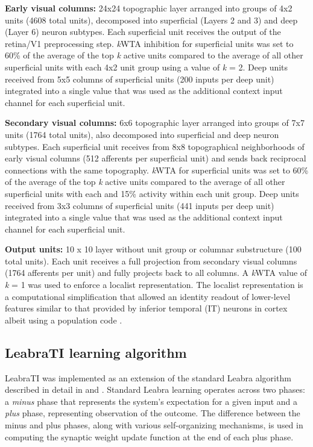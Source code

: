 \documentclass[dwyatte_dissertation.tex]{subfiles}
\begin{document}
\textbf{Early visual columns:} 24x24 topographic layer arranged into groups of 4x2 units (4608 total units), decomposed into superficial (Layers 2 and 3) and deep (Layer 6) neuron subtypes. Each superficial unit receives the output of the retina/V1 preprocessing step. \textit{k}WTA inhibition for superficial units was set to 60\% of the average of the top \textit{k} active units compared to the average of all other superficial units with each 4x2 unit group using a value of \textit{k} = 2. Deep units received from 5x5 columns of superficial units (200 inputs per deep unit) integrated into a single value that was used as the additional context input channel for each superficial unit.

\textbf{Secondary visual columns:} 6x6 topographic layer arranged into groups of 7x7 units (1764 total units), also decomposed into superficial and deep neuron subtypes. Each superficial unit receives from 8x8 topographical neighborhoods of early visual columns (512 afferents per superficial unit) and sends back reciprocal connections with the same topography. \textit{k}WTA for superficial units was set to 60\% of the average of the top \textit{k} active units compared to the average of all other superficial units with each and 15\% activity within each unit group. Deep units received from 3x3 columns of superficial units (441 inputs per deep unit) integrated into a single value that was used as the additional context input channel for each superficial unit.

\textbf{Output units:} 10 x 10 layer without unit group or columnar substructure (100 total units). Each unit receives a full projection from secondary visual columns (1764 afferents per unit) and fully projects back to all columns. A \textit{k}WTA value of \textit{k} = 1 was used to enforce a localist representation. The localist representation is a computational simplification that allowed an identity readout of lower-level features similar to that provided by inferior temporal (IT) neurons in cortex albeit using a population code \cite{HungKreimanPoggioEtAl05,LiCoxZoccolanEtAl09}.

\subsection{LeabraTI learning algorithm}

LeabraTI was implemented as an extension of the standard Leabra algorithm described in detail in  and . Standard Leabra learning operates across two phases: a \textit{minus} phase that represents the system's expectation for a given input and a \textit{plus} phase, representing observation of the outcome. The difference between the minus and plus phases, along with various self-organizing mechanisms, is used in computing the synaptic weight update function at the end of each plus phase.
\end{document}
